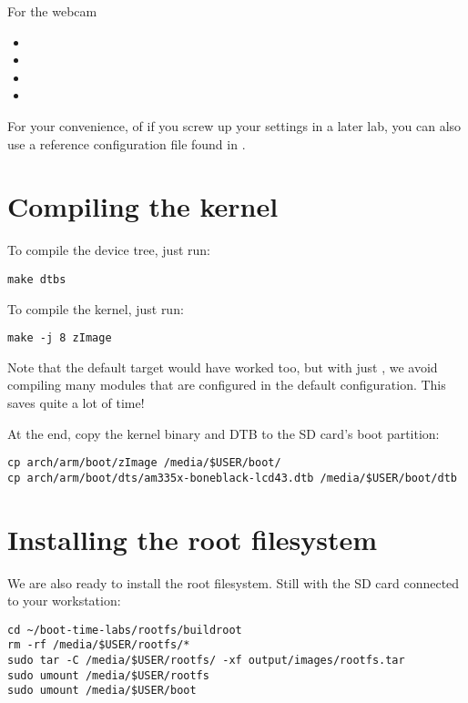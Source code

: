 For the webcam
\begin{itemize}
\item {} 
\item {}
\item {}
\item {}
\end{itemize}

For your convenience, of if you screw up your settings in a later lab,
you can also use a reference configuration file found in
.

\section{Compiling the kernel}

To compile the device tree, just run:
\begin{verbatim}
make dtbs
\end{verbatim}

To compile the kernel, just run:
\begin{verbatim}
make -j 8 zImage
\end{verbatim}

Note that the default  target would have worked too, but with
just , we avoid compiling many modules that are configured
in the default configuration. This saves quite a lot of time!

At the end, copy the kernel binary and DTB to the SD card's boot
partition:

\begin{verbatim}
cp arch/arm/boot/zImage /media/$USER/boot/
cp arch/arm/boot/dts/am335x-boneblack-lcd43.dtb /media/$USER/boot/dtb
\end{verbatim}

\section{Installing the root filesystem}

We are also ready to install the root filesystem. Still with the SD card
connected to your workstation:

\begin{verbatim}
cd ~/boot-time-labs/rootfs/buildroot
rm -rf /media/$USER/rootfs/*
sudo tar -C /media/$USER/rootfs/ -xf output/images/rootfs.tar
sudo umount /media/$USER/rootfs
sudo umount /media/$USER/boot
\end{verbatim}

